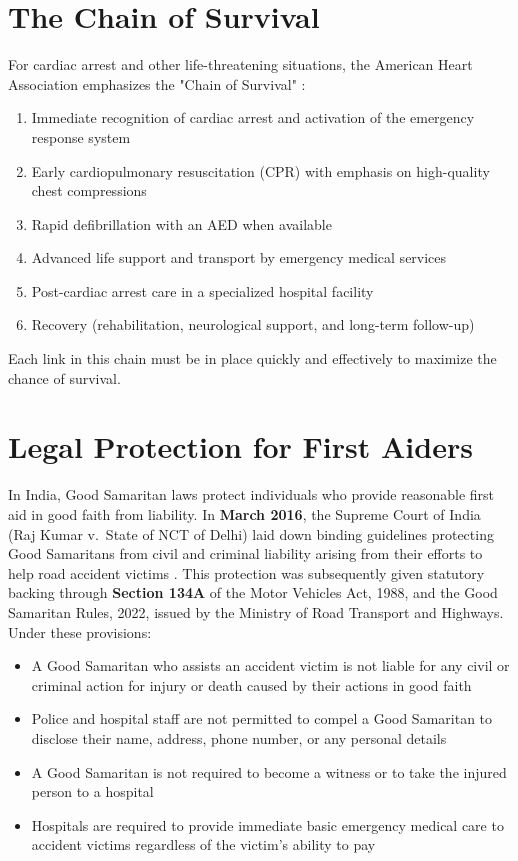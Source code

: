 \section{The Chain of Survival}

For cardiac arrest and other life-threatening situations, the American Heart Association emphasizes the "Chain of Survival" \cite{aha_bls_2020,ilcor_2025}:

\begin{enumerate}[leftmargin=*]
  \item Immediate recognition of cardiac arrest and activation of the emergency response system
  \item Early cardiopulmonary resuscitation (CPR) with emphasis on high-quality chest compressions
  \item Rapid defibrillation with an AED when available
  \item Advanced life support and transport by emergency medical services
  \item Post-cardiac arrest care in a specialized hospital facility
  \item Recovery (rehabilitation, neurological support, and long-term follow-up)
\end{enumerate}
Each link in this chain must be in place quickly and effectively to maximize the chance of survival.

\section{Legal Protection for First Aiders}

In India, Good Samaritan laws protect individuals who provide reasonable first aid in good faith from liability. In \textbf{March 2016}, the Supreme Court of India (Raj Kumar v.\ State of NCT of Delhi) laid down binding guidelines protecting Good Samaritans from civil and criminal liability arising from their efforts to help road accident victims \cite{sc_goodsam}. This protection was subsequently given statutory backing through \textbf{Section 134A} of the Motor Vehicles Act, 1988, and the Good Samaritan Rules, 2022, issued by the Ministry of Road Transport and Highways. Under these provisions:

\begin{itemize}[leftmargin=*]
  \item A Good Samaritan who assists an accident victim is not liable for any civil or criminal action for injury or death caused by their actions in good faith
  \item Police and hospital staff are not permitted to compel a Good Samaritan to disclose their name, address, phone number, or any personal details
  \item A Good Samaritan is not required to become a witness or to take the injured person to a hospital
  \item Hospitals are required to provide immediate basic emergency medical care to accident victims regardless of the victim's ability to pay
\end{itemize}

